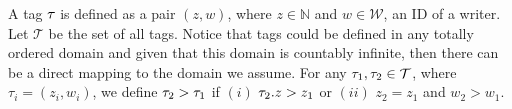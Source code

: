 %

A tag $\tau_{}$ is defined as a pair $(z, w)$, where $z \in \mathbb{N}$ and $w \in \mathcal{W}$, an ID of a writer.
Let $\mathcal{T}$ be the set of all tags.
Notice that tags could be defined in any totally ordered domain and given that this domain is countably infinite, then 
there can be a direct mapping to the domain we assume. 
For any  $\tau_{1}, \tau_{2} \in \mathcal{T}$, where $
\tau_i = (z_i, w_i)$,  we define  $\tau_{2} > \tau_{1}$ if $(i)$ $\tau_{2}.z > z_1$ or $(ii)$ $z_2 = z_1$ and $w_2 > w_1$.


